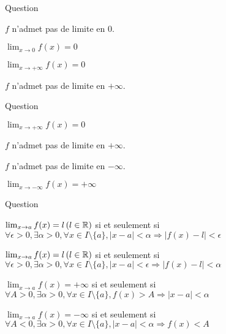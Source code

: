 \begin{multi}[multiple,feedback=
{Encadrer \(\sin\frac{1}{x}\) pour la limite en \(0\)   et encadrer \(\sin x\) pour la limite en \(+\infty\).
}]{Question}
    \item \(f\) n'admet pas de limite en \(0\).
    \item* \(\lim_{x\to 0} f(x)=0\)
    \item* \(\lim_{x\to +\infty} f(x)=0\)
    \item \(f\) n'admet pas de limite en \(+\infty\).
\end{multi}


\begin{multi}[multiple,feedback=
{Encadrer \(\cos(e^{2x})\) pour la limite en \(+\infty\).
}]{Question}
    \item* \(\lim_{x\to +\infty} f(x)=0\)
    \item \(f\) n'admet pas de limite en \(+\infty\).
    \item \(f\) n'admet pas de limite en \(-\infty\).
    \item* \(\lim_{x\to -\infty} f(x)=+\infty\)
\end{multi}


\begin{multi}[multiple,feedback=
{Voir la définition d'une limite finie ou infinie en un point \(a\in\Rr\) :
\(\lim_{x\to a} f(x)=l\) si et seulement si  \(\forall \epsilon >0,  \exists \alpha > 0, \forall x \in I\setminus\{a\}, |x-a| < \alpha \Rightarrow |f(x)-l|<\epsilon\)
\(\lim_{x\to a} f(x)=-\infty\) si et seulement si \(\forall A < 0,  \exists \alpha > 0, \forall x \in I\setminus\{a\}, |x-a| < \alpha \Rightarrow f(x) < A\)
}]{Question}
    \item* \(\lim_{x\to a} f(x)=l \, (l\in \mathbb{R})\) si et seulement si  \(\forall \epsilon >0,  \exists \alpha > 0, \forall x \in I\setminus\{a\}, |x-a| < \alpha \Rightarrow |f(x)-l|<\epsilon\)
    \item \(\lim_{x\to a} f(x)=l \, (l\in \mathbb{R})\) si et seulement si \(\forall \epsilon >0,  \exists \alpha > 0, \forall x  \in I\setminus\{a\}, |x-a|<\epsilon \Rightarrow |f(x)-l|<\alpha \)
    \item \(\lim_{x\to a} f(x)=+\infty\) si et seulement si \(\forall A > 0,  \exists \alpha > 0, \forall x \in I\setminus\{a\}, f(x) > A \Rightarrow |x-a| < \alpha\)
    \item* \(\lim_{x\to a} f(x)=-\infty\) si et seulement si \(\forall A < 0,  \exists \alpha > 0, \forall x \in I\setminus\{a\}, |x-a| < \alpha \Rightarrow f(x) < A\)
\end{multi}


